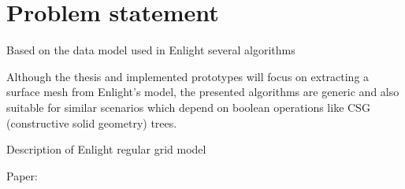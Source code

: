 
\section{Problem statement}

Based on the data model used in Enlight several algorithms 




Although the thesis and implemented prototypes will focus on extracting a surface mesh from Enlight's model, the presented algorithms are generic and also suitable for similar scenarios which depend on boolean operations like CSG (constructive solid geometry) trees.

Description of Enlight regular grid model

Paper: \cite{enlight}